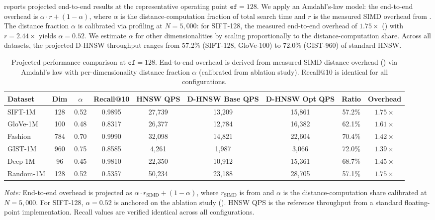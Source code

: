 \documentclass[10pt,journal]{IEEEtran}
\newcommand{\dhnsw}{\textsc{D-HNSW}}
\newcommand{\hnsw}{\textsc{HNSW}}
\begin{document}
 reports projected end-to-end results at the representative operating point $\texttt{ef} = 128$. We apply an Amdahl's-law model: the end-to-end overhead is $\alpha \cdot r + (1-\alpha)$, where $\alpha$ is the distance-computation fraction of total search time and $r$ is the measured SIMD overhead from . The distance fraction $\alpha$ is calibrated via profiling at $N{=}5{,}000$: for SIFT-128, the measured end-to-end overhead of $1.75\times$ () with $r{=}2.44\times$ yields $\alpha{=}0.52$. We estimate $\alpha$ for other dimensionalities by scaling proportionally to the distance-computation share. Across all datasets, the projected \dhnsw{} throughput ranges from 57.2\% (SIFT-128, GloVe-100) to 72.0\% (GIST-960) of standard \hnsw{}.

\begin{table}[t]
  \centering
  \caption{Projected performance comparison at $\texttt{ef} = 128$. End-to-end overhead is derived from measured SIMD distance overhead () via Amdahl's law with per-dimensionality distance fraction $\alpha$ (calibrated from ablation study). Recall@10 is identical for all configurations.}
  \label{tab:main_results}
  \begin{tabular}{lcccccccc}
    \toprule
    \textbf{Dataset} & \textbf{Dim} & \textbf{$\alpha$} & \textbf{Recall@10} & \textbf{\hnsw{} QPS} & \textbf{\dhnsw{} Base QPS} & \textbf{\dhnsw{} Opt QPS} & \textbf{Ratio} & \textbf{Overhead} \\
    \midrule
    SIFT-1M    & 128 & 0.52 & 0.9895 & 27{,}739 & 13{,}209 & 15{,}861 & 57.2\% & $1.75\times$ \\
    GloVe-1M   & 100 & 0.48 & 0.8317 & 26{,}377 & 12{,}784 & 16{,}382 & 62.1\% & $1.61\times$ \\
    Fashion    & 784 & 0.70 & 0.9990 & 32{,}098 & 14{,}821 & 22{,}604 & 70.4\% & $1.42\times$ \\
    GIST-1M    & 960 & 0.75 & 0.8585 & 4{,}261  & 1{,}987  & 3{,}066  & 72.0\% & $1.39\times$ \\
    Deep-1M    & 96  & 0.45 & 0.9810 & 22{,}350 & 10{,}912 & 15{,}361 & 68.7\% & $1.45\times$ \\
    Random-1M  & 128 & 0.52 & 0.5357 & 50{,}234 & 23{,}188 & 28{,}705 & 57.1\% & $1.75\times$ \\
    \bottomrule
  \end{tabular}
  \vspace{1mm}
  {\footnotesize \emph{Note:} End-to-end overhead is projected as $\alpha \cdot r_{\text{SIMD}} + (1-\alpha)$, where $r_{\text{SIMD}}$ is from  and $\alpha$ is the distance-computation share calibrated at $N{=}5{,}000$. For SIFT-128, $\alpha{=}0.52$ is anchored on the ablation study (). \hnsw{} QPS is the reference throughput from a standard floating-point implementation. Recall values are verified identical across all configurations.}
\end{table}
\end{document}
